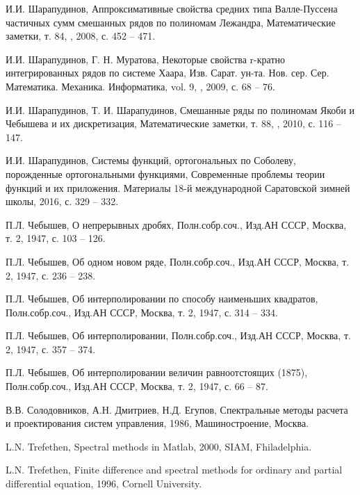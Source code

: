 \begin{thebibliography}{1}
И.И. Шарапудинов,
Аппроксимативные свойства средних типа Валле-Пуссена частичных сумм смешанных рядов по полиномам Лежандра,
Математические заметки, т. 84, , 2008, с. 452 -- 471.

 И.И. Шарапудинов,  Г. Н. Муратова,
Некоторые свойства r-кратно интегрированных рядов по системе Хаара,
Изв. Сарат. ун-та. Нов. сер. Сер. Математика. Механика. Информатика, vol. 9, , 2009, с. 68 -- 76.

И.И. Шарапудинов, Т. И. Шарапудинов,
Смешанные ряды по полиномам Якоби и Чебышева и их дискретизация,
Математические заметки, т. 88, , 2010, с. 116 -- 147.


И.И. Шарапудинов,
Системы функций, ортогональных по Соболеву, порожденные ортогональными функциями,
Современные проблемы теории функций и их приложения.  Материалы 18-й международной Саратовской зимней школы,
2016, с. 329 -- 332.

П.Л. Чебышев,
О непрерывных дробях, Полн.собр.соч., Изд.АН СССР, Москва, т. 2, 1947, с. 103 -- 126.

П.Л. Чебышев,
Об одном новом ряде, Полн.собр.соч., Изд.АН СССР, Москва, т. 2, 1947, с. 236 -- 238.

П.Л. Чебышев,
Об интерполировании по способу наименьших квадратов,
Полн.собр.соч., Изд.АН СССР, Москва, т. 2, 1947, с. 314 -- 334.

П.Л. Чебышев,
Об интерполировании, Полн.собр.соч., Изд.АН СССР, Москва, т. 2, 1947, с. 357 -- 374.

П.Л. Чебышев,
Об интерполировании величин  равноотстоящих (1875),
Полн.собр.соч., Изд.АН СССР, Москва, т. 2, 1947, с. 66 -- 87.

В.В. Солодовников, А.Н. Дмитриев, Н.Д. Егупов,
Спектральные методы расчета и проектирования систем управления, 1986, Машиностроение, Москва.


L.N. Trefethen,
Spectral methods in Matlab, 2000, SIAM, Fhiladelphia.

L.N. Trefethen,
Finite difference and spectral methods for ordinary and partial differential equation,
1996, Cornell University.


\end{thebibliography}
